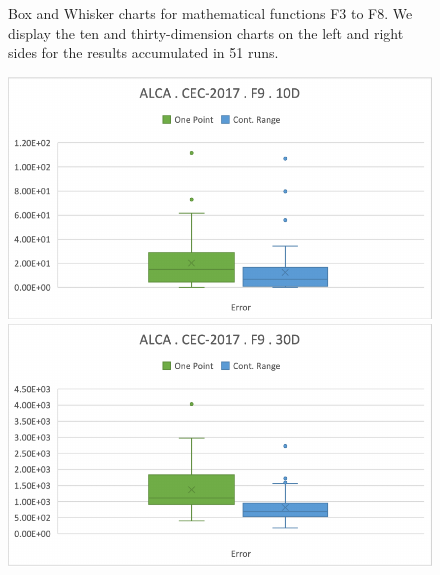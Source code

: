 \documentclass[graybox]{svmult}
\begin{document}
\begin{figure}[!ht]
        \caption{Box and Whisker charts for mathematical functions F3 to F8. We display the ten and thirty-dimension charts on the left and right sides for the results accumulated in 51 runs.} \label{fig.experiment_F3-F8}
    \end{figure}

    \FloatBarrier

    \begin{figure}[!ht]
        \begin{minipage}[h]{0.49\linewidth}
            \includegraphics[width=1\linewidth]{img/fig_experiment_F9x10D.pdf} 
        \end{minipage}
        \hfill
        \vspace{0.05 cm}
        \begin{minipage}[h]{0.49\linewidth}
            \includegraphics[width=1\linewidth]{img/fig_experiment_F9x30D.pdf} 
        \end{minipage}
        \vfill
        \vspace{0.05 cm}
        \begin{minipage}[h]{0.49\linewidth}

\end{minipage}
\end{figure}
\end{document}
